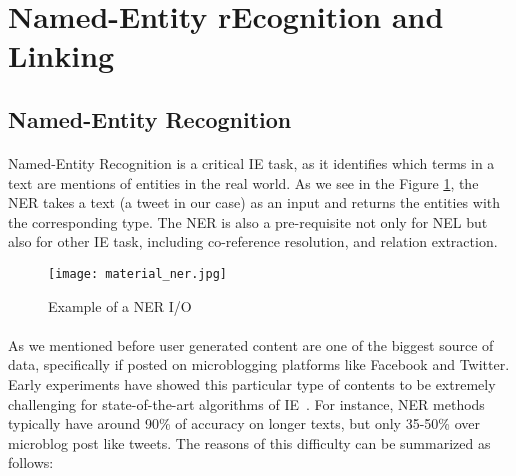 \section{Named-Entity rEcognition and Linking}

\subsection{Named-Entity Recognition}
\paragraph{}
Named-Entity Recognition is a critical IE task, as it identifies which terms in a text are mentions of entities in the real world.
As we see in the Figure \ref{fig:ner_io}, the NER takes a text (a tweet in our case) as an input and returns the entities with the corresponding type. The NER is also a pre-requisite not only for NEL but also for other IE task, including co-reference resolution, and relation extraction.

\begin{figure}[ht]
\texttt{[image: material\_ner.jpg]}
\caption{Example of a NER I/O}
\label{fig:ner_io}
\end{figure}
\vspace{-10pt}

\paragraph{}
As we mentioned before user generated content are one of the biggest source of data, specifically if posted on microblogging platforms like Facebook and Twitter. Early experiments have showed this particular type of contents to be extremely challenging for state-of-the-art algorithms of IE~\cite{derczynski2013microblog}. For instance, NER methods typically have around 90\% of accuracy on longer texts, but only 35-50\% over microblog post like tweets. The reasons of this difficulty can be summarized as follows:

